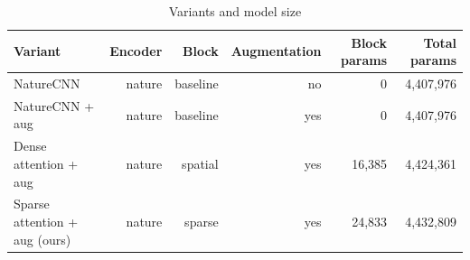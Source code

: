 \begin{table}[t]
\centering
\caption{Variants and model size}
\label{tab:architecture_params}
\begin{tabular}{lrrrrr}
\toprule
Variant & Encoder & Block & Augmentation & Block params & Total params \\
\midrule
NatureCNN & nature & baseline & no & 0 & 4,407,976 \\
NatureCNN + aug & nature & baseline & yes & 0 & 4,407,976 \\
Dense attention + aug & nature & spatial & yes & 16,385 & 4,424,361 \\
Sparse attention + aug (ours) & nature & sparse & yes & 24,833 & 4,432,809 \\
\bottomrule
\end{tabular}
\end{table}
